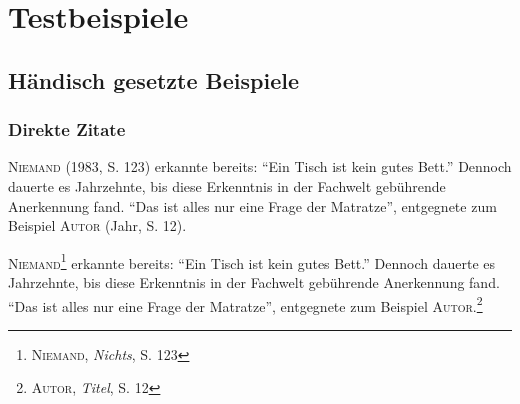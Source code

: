 \chapter{Testbeispiele}
\iffalse
\zit[\bibstring{confer}][]{Scherz}{Ein wörtliches Zitat, das mit einem Punkt endet.}
\zit[\bibstring{confer}][]{Scherz}{Ein wörtliches Zitat, das mit einem Fragezeichen endet?}
\zit[\bibstring{confer}][]{Scherz}{Ein wörtliches Zitat, das mit einem Punkt endet}.
\zit[\bibstring{confer}][]{Scherz}{Ein wörtliches Zitat, das mit einem Fragezeichen endet}?
\zit[\bibstring{confer}][]{Scherz}[.]{Ein wörtliches Zitat, das mit einem Punkt endet}
\zit[\bibstring{confer}][]{Scherz}[?]{Ein wörtliches Zitat, das mit einem Fragezeichen endet}

\section{Wörtliche Zitate}
\subsection{Satz endet mit Zitat}
\zit[Im Vorwort zu][]{Scherz}[]{Das haben Sie gesagt}.
\zit[im Vorwort zu][]{Scherz}[?]{Was glauben Sie}
\subsection{Satz wird nach dem Zitat fortgesetzt}
\zit[im Vorwort zu][]{Scherz}[?]{Was glauben Sie}, könnte man dazu fragen.
 
\Textcite[123]{Lessing} erkannte bereits: "`Ein Tisch ist kein gutes Bett."'
\fi

\section{Händisch gesetzte Beispiele}
\subsection{Direkte Zitate}
\textsc{Niemand} (1983, S. 123) erkannte bereits: "`Ein Tisch ist kein
gutes Bett."' Dennoch dauerte es Jahrzehnte, bis diese Erkenntnis in der
Fachwelt gebührende Anerkennung fand. "`Das ist alles nur eine Frage der
Matratze"', entgegnete zum Beispiel \textsc{Autor} (Jahr, S. 12).

\textsc{Niemand}\footnote{\textsc{Niemand}, \textit{Nichts}, S. 123}
erkannte bereits: "`Ein Tisch ist kein gutes Bett."'  Dennoch dauerte es
Jahrzehnte, bis diese Erkenntnis in der Fachwelt gebührende Anerkennung
fand. "`Das ist alles nur eine Frage der Matratze"', entgegnete zum
Beispiel \textsc{Autor}.\footnote{\textsc{Autor}, \textit{Titel}, S. 12}

